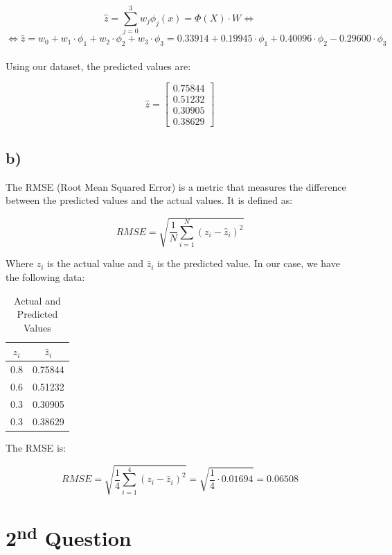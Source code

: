 \documentclass{article}
\begin{document}
\[ \hat{z} = \sum_{j=0}^{3} w_j \phi_j(x) = \Phi(X) \cdot W  \Leftrightarrow \]
\[ \Leftrightarrow \hat{z} = w_0 + w_1 \cdot \phi_1 + w_2 \cdot \phi_2 + w_3 \cdot \phi_3 = 0.33914 + 0.19945 \cdot \phi_1 + 0.40096 \cdot \phi_2 - 0.29600 \cdot \phi_3 \]

\paragraph{}
Using our dataset, the predicted values are:

\[ \hat{z} = \begin{bmatrix}
    0.75844 \\
    0.51232 \\
    0.30905 \\
    0.38629
\end{bmatrix} \]

\subsection*{b)}

The RMSE (Root Mean Squared Error) is a metric that measures the difference between the predicted values and the actual values. It is defined as:

\[ RMSE = \sqrt{\frac{1}{N} \sum_{i=1}^{N} (z_i - \hat{z}_i)^2} \]

Where $z_i$ is the actual value and $\hat{z}_i$ is the predicted value.
In our case, we have the following data:

\begin{table}[H]
    \centering
    \begin{tabular}{|c|c|}
        \hline
        $z_i$ & $\hat{z}_i$ \\ \hline
        0.8   & 0.75844     \\ \hline
        0.6   & 0.51232     \\ \hline
        0.3   & 0.30905     \\ \hline
        0.3   & 0.38629     \\ \hline
    \end{tabular}
    \caption{Actual and Predicted Values}
    \label{tab:my_label}
\end{table}

The RMSE is:

\[ RMSE = \sqrt{\frac{1}{4} \sum_{i=1}^{4} (z_i - \hat{z}_i)^2} = \sqrt{\frac{1}{4} \cdot 0.01694} = 0.06508 \]


\newpage

\section*{2\textsuperscript{nd} Question}
\end{document}
